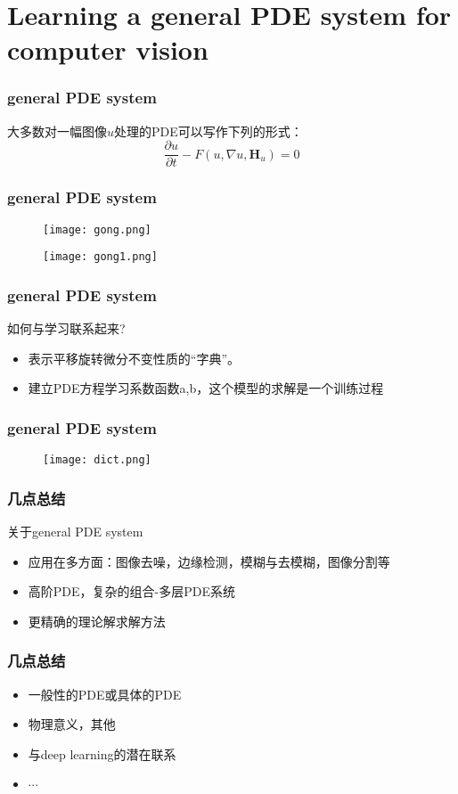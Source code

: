 \documentclass[notheorems,mathserif,table,compress]{beamer}  %
\begin{document}
\section{Learning a general PDE system for computer vision}

%
\begin{frame}
\frametitle{general PDE system}
大多数对一幅图像$u$处理的PDE可以写作下列的形式：
\begin{displaymath}
\frac{\partial u}{\partial t}-F(u,\nabla u,\mathbf{H}_u)=0
\end{displaymath}


\end{frame}

%
\begin{frame}
\frametitle{general PDE system}
\begin{figure}
\texttt{[image: gong.png]}
\end{figure}
\begin{figure}
\texttt{[image: gong1.png]}
\end{figure}

\end{frame}

%
\begin{frame}
\frametitle{general PDE system}
如何与学习联系起来?
\begin{itemize}
\item 表示平移旋转微分不变性质的“字典”。
\item 建立PDE方程学习系数函数a,b，这个模型的求解是一个训练过程
\end{itemize}

\end{frame}

%
\begin{frame}
\frametitle{general PDE system}
\begin{figure}
\texttt{[image: dict.png]}
\end{figure}

\end{frame}


%
\begin{frame}
\frametitle{几点总结}
关于general PDE system
\begin{itemize}
\item 应用在多方面：图像去噪，边缘检测，模糊与去模糊，图像分割等
\item 高阶PDE，复杂的组合-多层PDE系统
\item 更精确的理论解求解方法
\end{itemize}

\end{frame}

%
\begin{frame}
\frametitle{几点总结}
\begin{itemize}
\item 一般性的PDE或具体的PDE
\item 物理意义，其他
\item 与deep learning的潜在联系
\item $\cdots$
\end{itemize}
\end{frame}
\end{document}
